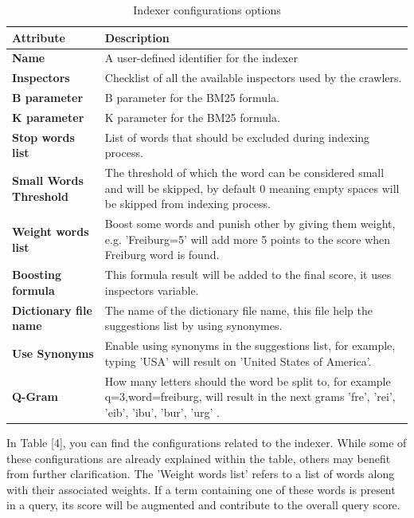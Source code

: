 \begin{table}[ht] 
{\footnotesize
\begin{tabular}{ |p{2.5cm}||p{10.3cm}|  }
 \hline \hline
\textbf{Attribute} & \textbf{Description}\T\B 
\\ 
\hline
\textbf{Name} & A user-defined identifier for the indexer \T\B 
\\ 
\hline
\textbf{Inspectors} & Checklist of all the available inspectors used by the crawlers. \T\B 
\\ 
\hline
\textbf{B parameter} & B parameter for the BM25 formula. \T\B 
\\ 
\hline
\textbf{K parameter} & K parameter for the BM25 formula. \T\B 
\\ 
\hline
\textbf{Stop words list} & List of words that should be excluded during indexing process. \T\B 
\\ 
\hline
\textbf{Small Words Threshold} & The threshold of which the word can be considered small and will be skipped, by default 0 meaning empty spaces will be skipped from indexing process. \T\B 
\\ 
\hline
\textbf{Weight words list} & Boost some words and punish other by giving them weight, e.g. 'Freiburg=5' will add more 5 points to the score when Freiburg word is found. \T\B 
\\ 
\hline
\textbf{Boosting formula} & This formula result will be added to the final score, it uses inspectors variable. \T\B 
\\ 
\hline
\textbf{Dictionary file name} & The name of the dictionary file name, this file help the suggestions list by using synonymes. \T\B 
\\ 
\hline
\textbf{Use Synonyms} & Enable using synonyms in the suggestions list, for example, typing 'USA' will result on 'United States of America'. \T\B 
\\ 
\hline
\textbf{Q-Gram} & How many letters should the word be split to, for example q=3,word=freiburg, will result in the next grams { 'fre', 'rei', 'eib', 'ibu', 'bur', 'urg' }. \T\B 
\\ 
\hline \hline
    \end{tabular}
}
  \captionsetup{justification=centering,margin=2cm}
  \caption{Indexer configurations options}
  \label{table:indexing-config}
\end{table}

In Table [4], you can find the configurations related to the indexer. While some of these configurations are already explained within the table, others may benefit from further clarification. The 'Weight words list' refers to a list of words along with their associated weights. If a term containing one of these words is present in a query, its score will be augmented and contribute to the overall query score.


